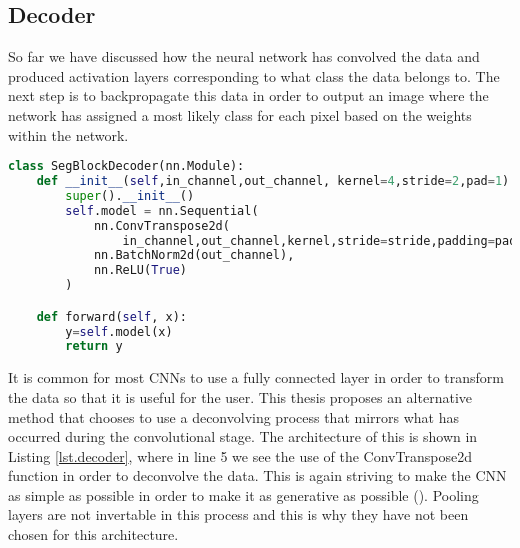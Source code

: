 \subsection{Decoder}
So far we have discussed how the neural network has convolved the data and produced activation layers corresponding to what class the data belongs to. The next step is to backpropagate this data in order to output an image where the network has assigned a most likely class for each pixel based on the weights within the network. 
\begin{lstlisting}[language=Python, caption = Decoder architecture, label={lst.decoder}]
class SegBlockDecoder(nn.Module):
    def __init__(self,in_channel,out_channel, kernel=4,stride=2,pad=1):
        super().__init__()
        self.model = nn.Sequential(
            nn.ConvTranspose2d(
                in_channel,out_channel,kernel,stride=stride,padding=pad,bias=False),
            nn.BatchNorm2d(out_channel),
            nn.ReLU(True)
        )

    def forward(self, x):
        y=self.model(x)
        return y
\end{lstlisting}
It is common for most CNNs to use a fully connected layer in order to transform the data so that it is useful for the user. This thesis proposes an alternative method that chooses to use a deconvolving process that mirrors what has occurred during the convolutional stage. The architecture of this is shown in Listing \ref{lst.decoder}, where in line 5 we see the use of the ConvTranspose2d function in order to deconvolve the data. This is again striving to make the CNN as simple as possible in order to make it as generative as possible (\cite{Springenberg14}). Pooling layers are not invertable in this process and this is why they have not been chosen for this architecture.
